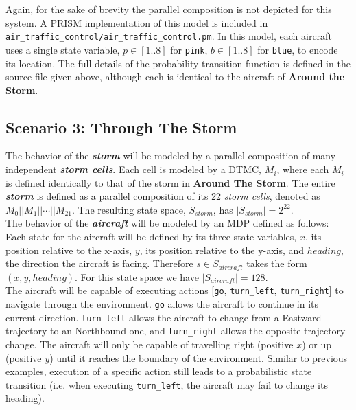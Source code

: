 \documentclass{article}
\begin{document}
Again, for the sake of brevity the parallel composition is not depicted for this system. A PRISM implementation of this model is included in \texttt{air\_traffic\_control/air\_traffic\_control.pm}. In this model, each aircraft uses a single state variable, $p\in[1..8]$ for \texttt{pink}, $b\in[1..8]$ for \texttt{blue}, to encode its location. The full details of the probability transition function is defined in the source file given above, although each is identical to the aircraft of \textbf{Around the Storm}.
\subsection*{Scenario 3: Through The Storm}
The behavior of the \textbf{\textit{storm}} will be modeled by a parallel composition of many independent \textbf{\textit{storm cells}}. Each cell is  modeled by a DTMC, $M_i$, where each  $M_i$ is defined identically to that of the storm in \textbf{Around The Storm}. The entire \textbf{\textit{storm}} is defined as a parallel composition of its 22 \textit{storm cells}, denoted as $M_0 || M_1 || \cdots || M_{21}$. The resulting state space, $S_{storm}$, has $|S_{storm}|=2^{22}$. \\

The behavior of the \textbf{\textit{aircraft}} will be modeled by an MDP defined as follows: \\

Each state for the aircraft will be defined by its three state variables, $x$, its position relative to the x-axis, $y$, its position relative to the y-axis, and $heading$, the direction the aircraft is facing. Therefore $s\in S_{aircraft}$ takes the form $(x,y,heading)$. For this state space we have $|S_{aircraft}|=128$. \\

The aircraft will be capable of executing actions [\texttt{go}, \texttt{turn\_left}, \texttt{turn\_right}] to navigate through the environment. \texttt{go} allows the aircraft to continue in its current direction. \texttt{turn\_left} allows the aircraft to change from a Eastward trajectory to an Northbound one, and \texttt{turn\_right} allows the opposite trajectory change. The aircraft will only be capable of travelling right (positive $x$) or up (positive $y$) until it reaches the boundary of the environment. Similar to previous examples, execution of a specific action still leads to a probabilistic state transition (i.e.  when executing \texttt{turn\_left}, the aircraft may fail to change its heading). \\
\end{document}
